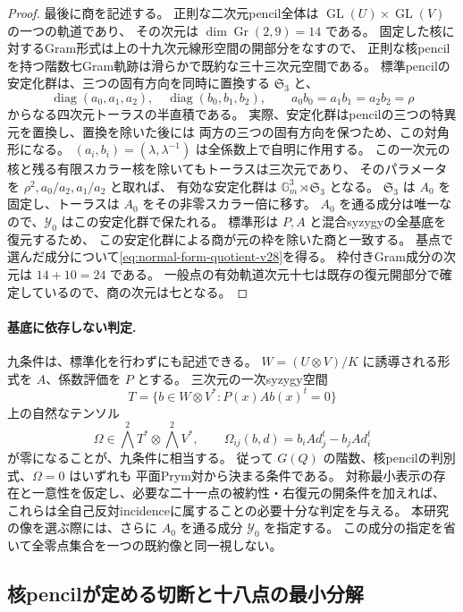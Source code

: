 \begin{proof}
最後に商を記述する。
正則な二次元pencil全体は $\operatorname{GL}(U)\times\operatorname{GL}(V)$ の一つの軌道であり、
その次元は $\dim\operatorname{Gr}(2,9)=14$ である。
固定した核に対するGram形式は上の十九次元線形空間の開部分をなすので、
正則な核pencilを持つ階数七Gram軌跡は滑らかで既約な三十三次元空間である。
標準pencilの安定化群は、三つの固有方向を同時に置換する $\mathfrak S_3$ と、
\[
 \operatorname{diag}(a_0,a_1,a_2),\quad
 \operatorname{diag}(b_0,b_1,b_2),\qquad
 a_0b_0=a_1b_1=a_2b_2=\rho
\]
からなる四次元トーラスの半直積である。
実際、安定化群はpencilの三つの特異元を置換し、置換を除いた後には
両方の三つの固有方向を保つため、この対角形になる。
$(a_i,b_i)=(\lambda,\lambda^{-1})$ は全係数上で自明に作用する。
この一次元の核と残る有限スカラー核を除いてもトーラスは三次元であり、
そのパラメータを $\rho^2,a_0/a_2,a_1/a_2$ と取れば、
有効な安定化群は $\mathbb G_m^3\rtimes\mathfrak S_3$ となる。
$\mathfrak S_3$ は $A_0$ を固定し、トーラスは $A_0$ をその非零スカラー倍に移す。
$A_0$ を通る成分は唯一なので、$\mathcal Y_0$ はこの安定化群で保たれる。
標準形は $P,A$ と混合syzygyの全基底を復元するため、
この安定化群による商が元の枠を除いた商と一致する。
基点で選んだ成分について\eqref{eq:normal-form-quotient-v28}を得る。
枠付きGram成分の次元は $14+10=24$ である。
一般点の有効軌道次元十七は既存の復元開部分で確定しているので、商の次元は七となる。
\end{proof}

\paragraph{基底に依存しない判定.}
九条件は、標準化を行わずにも記述できる。
$W=(U\otimes V)/K$ に誘導される形式を $A$、係数評価を $P$ とする。
三次元の一次syzygy空間
\[
 T=\{b\in W\otimes V^*:P(x)Ab(x)^t=0\}
\]
上の自然なテンソル
\[
 \Omega\in\bigwedge^2T^*\otimes\bigwedge^2V^*,
 \qquad
 \Omega_{ij}(b,d)=b_iAd_j^t-b_jAd_i^t
\]
が零になることが、九条件に相当する。
従って $G(Q)$ の階数、核pencilの判別式、$\Omega=0$ はいずれも
平面Prym対から決まる条件である。
対称最小表示の存在と一意性を仮定し、必要な二十一点の被約性・右復元の開条件を加えれば、
これらは全自己反対incidenceに属することの必要十分な判定を与える。
本研究の像を選ぶ際には、さらに $A_0$ を通る成分 $\mathcal Y_0$ を指定する。
この成分の指定を省いて全零点集合を一つの既約像と同一視しない。

\subsection{核pencilが定める切断と十八点の最小分解}
\label{subsec:canonical-prym-section-v28}

